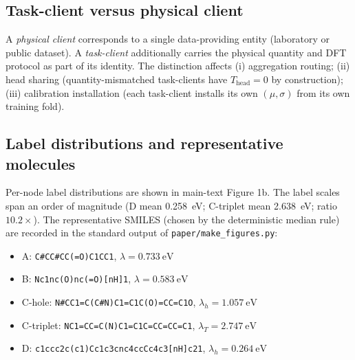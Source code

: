 \documentclass[11pt,a4paper]{article}
\begin{document}
\subsection{Task-client versus physical client}
A \emph{physical client} corresponds to a single data-providing entity (laboratory or public dataset). A \emph{task-client} additionally carries the physical quantity and DFT protocol as part of its identity. The distinction affects (i) aggregation routing; (ii) head sharing (quantity-mismatched task-clients have $T_{\mathrm{head}} = 0$ by construction); (iii) calibration installation (each task-client installs its own $(\mu, \sigma)$ from its own training fold).

\subsection{Label distributions and representative molecules}
Per-node label distributions are shown in main-text Figure 1b. The label scales span an order of magnitude (D mean \SI{0.258}{\eV}; C-triplet mean \SI{2.638}{\eV}; ratio $10.2\times$). The representative SMILES (chosen by the deterministic median rule) are recorded in the standard output of \texttt{paper/make\_figures.py}:
\begin{itemize}
  \item A: \texttt{C\#CC\#CC(=O)C1CC1}, $\lambda = \SI{0.733}{\eV}$
  \item B: \texttt{Nc1nc(O)nc(=O)[nH]1}, $\lambda = \SI{0.583}{\eV}$
  \item C-hole: \texttt{N\#CC1=C(C\#N)C1=C1C(O)=CC=C1O}, $\lambda_h = \SI{1.057}{\eV}$
  \item C-triplet: \texttt{NC1=CC=C(N)C1=C1C=CC=CC=C1}, $\lambda_T = \SI{2.747}{\eV}$
  \item D: \texttt{c1ccc2c(c1)Cc1c3cnc4ccCc4c3[nH]c21}, $\lambda_h = \SI{0.264}{\eV}$
\end{itemize}
\end{document}

